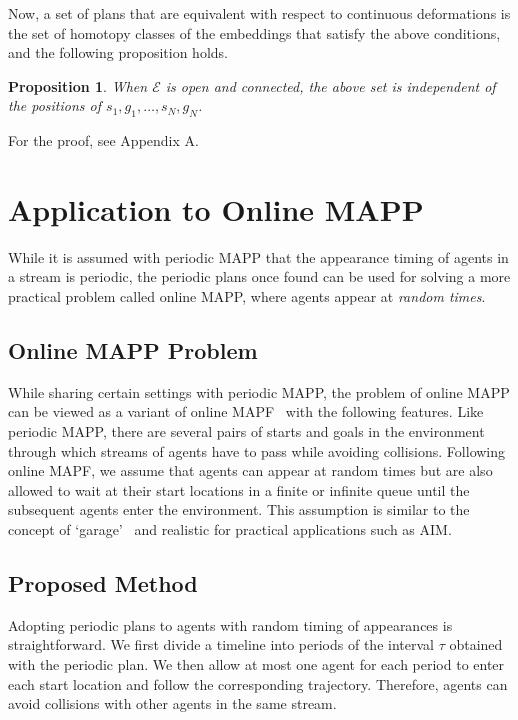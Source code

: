 \documentclass[letterpaper]{article} %
\newtheorem{proposition}{Proposition}
\begin{document}
Now, a set of plans that are equivalent with respect to continuous deformations is the set of homotopy classes of the embeddings that satisfy the above conditions, and the following proposition holds.

\begin{proposition}
When $\mathcal{E}$ is open and connected, the above set is independent of the positions of $s_1, g_1,\ldots, s_N, g_N$.
\end{proposition}
For the proof, see Appendix A.

\section{Application to Online MAPP}\label{sec:application}
While it is assumed with periodic MAPP that the appearance timing of agents in a stream is periodic, the periodic plans once found can be used for solving a more practical problem called online MAPP, where agents appear at \emph{random times}.

\subsection{Online MAPP Problem}
While sharing certain settings with periodic MAPP, the problem of online MAPP can be viewed as a variant of online MAPF~\cite{vsvancara2019online} with the following features. Like periodic MAPP, there are several pairs of starts and goals in the environment through which streams of agents have to pass while avoiding collisions. Following online MAPF, we assume that agents can appear at random times but are also allowed to wait at their start locations in a finite or infinite queue until the subsequent agents enter the environment. This assumption is similar to the concept of `garage'~\citep{vsvancara2019online} and realistic for practical applications such as AIM.


\subsection{Proposed Method}
Adopting periodic plans to agents with random timing of appearances is straightforward. We first divide a timeline into periods of the interval $\tau$ obtained with the periodic plan. We then allow at most one agent for each period to enter each start location and follow the corresponding trajectory. Therefore, agents can avoid collisions with other agents in the same stream.
\end{document}

